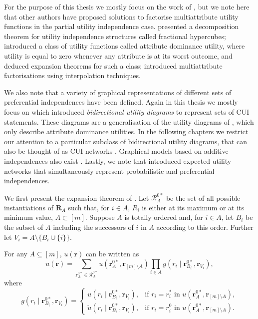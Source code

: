 For the purpose of this thesis we mostly focus on the work of \citet{Abbas2010}, but we note here that other authors have proposed solutions to factorise multiattribute utility functions in the partial utility independence case. \citet{Farquhar1975} presented a decomposition theorem for utility independence structures called fractional hypercubes; \citet{Abbas2005} introduced a class of utility functions called attribute dominance utility, where utility is equal to zero whenever any attribute is at its worst outcome, and deduced expansion theorems for such a class; \citet{Bell1979} introduced multiattribute factorisations using interpolation techniques. 

We also note  that a variety of graphical representations of different sets of preferential independences have been defined. Again in this thesis we  mostly focus on \citet{Abbas2010} which introduced \textit{bidirectional utility diagrams} to represent sets of CUI statements. These diagrams are a generalisation of the utility diagrams of \citet{Abbas2005}, which only describe attribute dominance utilities. In the following chapters we  restrict our attention to a particular subclass of bidirectional utility diagrams, that can also be thought of as CUI networks \citep{Engel2008}. Graphical models based on additive independences also exist \citep{Bacchus1995, Braziunas2005}. Lastly, we note that \citet{Mura99} introduced expected utility networks that simultaneously represent probabilistic and preferential independences. 


We first present the expansion theorem of \citet{Abbas2010}. Let $\bm{\mathcal{R}}_A^{0*}$ be the set of all possible instantiations of $\bm{R}_A$ such that, for $i\in A$, $R_i$ is either at its maximum or at its minimum value, $A\subset [m]$. Suppose $A$ is totally ordered and, for $i\in A$, let $B_i$ be the subset of $A$ including the successors of $i$ in $A$ according to this order. Further let $V_i=A\setminus \{B_i\cup \{i\}\}$.

\begin{proposition}
\label{prop:utexpansion}
For any $A\subseteq[m]$, $u(\bm{r})$ can be written as
\begin{equation}
\label{eq:genut}
u(\bm{r})=\sum_{\bm{r}_A^{0*}\in \bm{\mathcal{R}}_A^{0*}}u(\bm{r}_A^{0*},\bm{r}_{[m]\setminus A})\prod_{i\in A}g(r_i\;|\; \bm{r}_{B_i}^{0*},\bm{r}_{V_i}),
\end{equation}
where 
\begin{equation*}
g(r_i\;|\; \bm{r}_{B_i}^{0*},\bm{r}_{V_i})=\left\{
\begin{array}{ll}
u(r_i\;|\; \bm{r}_{B_i}^{0*},\bm{r}_{V_i}),& \mbox{if } r_i=r_i^* \mbox{ in } u(\bm{r}_A^{0*},\bm{r}_{[m]\setminus A}) ,\\
\check{u}(r_i\;|\; \bm{r}_{B_i}^{0*},\bm{r}_{V_i}),&\mbox{if } r_i=r_i^0 \mbox{ in } u(\bm{r}_A^{0*},\bm{r}_{[m]\setminus A}).
\end{array}
\right.
\end{equation*}
\end{proposition}


